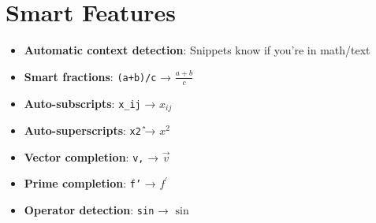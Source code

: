 \documentclass{article}
\newcommand{\example}[1]{\colorbox{codebg}{\texttt{#1}}}
\begin{document}
\section{Smart Features}

\begin{tcolorbox}[colback=pink!5!white,colframe=pink!75!black,title=Intelligent Behaviors]
\begin{itemize}[leftmargin=*]
\item \textbf{Automatic context detection}: Snippets know if you're in math/text
\item \textbf{Smart fractions}: \example{(a+b)/c} → \(\frac{a+b}{c}\)
\item \textbf{Auto-subscripts}: \example{x\_ij} → \(x_{ij}\)
\item \textbf{Auto-superscripts}: \example{x\^2} → \(x^2\)
\item \textbf{Vector completion}: \example{v,} → \(\vec{v}\)
\item \textbf{Prime completion}: \example{f'} → \(f^{\prime}\)
\item \textbf{Operator detection}: \example{sin} → \(\sin\)
\end{itemize}
\end{tcolorbox}
\end{document}
